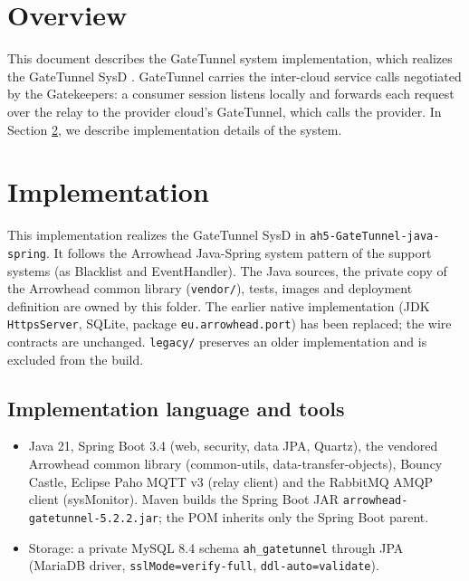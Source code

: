 \documentclass[a4paper]{arrowhead}
\begin{document}
\section{Overview}
\label{sec:overview}

This document describes the GateTunnel system implementation, which realizes the GateTunnel SysD \cite{gt-sysd}. GateTunnel carries the inter-cloud service calls negotiated by the Gatekeepers: a consumer session listens locally and forwards each request over the relay to the provider cloud's GateTunnel, which calls the provider.
In Section \ref{Implementation}, we describe implementation details of the system.

\newpage

\section{Implementation}
\label{Implementation}

This implementation realizes the GateTunnel SysD in \texttt{ah5-\allowbreak{}GateTunnel-\allowbreak{}java-\allowbreak{}spring}. It follows the Arrowhead Java-Spring system pattern of the support systems (as Blacklist and EventHandler). The Java sources, the private copy of the Arrowhead common library (\texttt{vendor/\allowbreak{}}), tests, images and deployment definition are owned by this folder. The earlier native implementation (JDK \texttt{HttpsServer}, SQLite, package \texttt{eu.\allowbreak{}arrowhead.\allowbreak{}port}) has been replaced; the wire contracts are unchanged. \texttt{legacy/\allowbreak{}} preserves an older implementation and is excluded from the build.

\subsection{Implementation language and tools}
\begin{itemize}
\item Java 21, Spring Boot 3.4 (web, security, data JPA, Quartz), the vendored Arrowhead common library (common-utils, data-transfer-objects), Bouncy Castle, Eclipse Paho MQTT v3 (relay client) and the RabbitMQ AMQP client (sysMonitor). Maven builds the Spring Boot JAR \texttt{arrowhead-\allowbreak{}gatetunnel-\allowbreak{}5.2.2.jar}; the POM inherits only the Spring Boot parent.
\item Storage: a private MySQL 8.4 schema \texttt{ah\_\allowbreak{}gatetunnel} through JPA (MariaDB driver, \texttt{sslMode=verify-full}, \texttt{ddl-auto=validate}).
\end{itemize}
\end{document}
